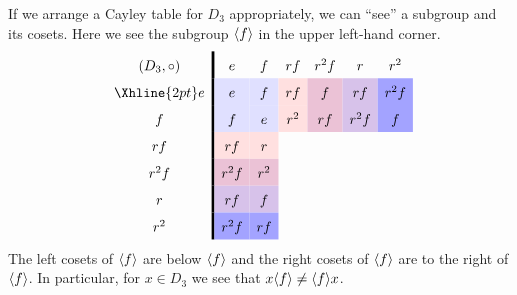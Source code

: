 \documentclass{ximera}
\begin{document}
\begin{example}
  If we arrange a Cayley table for $D_3$ appropriately, we can ``see''
  a subgroup and its cosets. Here we see the subgroup $\langle f\rangle$ in the
  upper left-hand corner.
    \[
    \renewcommand{\arraystretch}{1.6}
    \begin{array}{c!{\vline width 2pt}cccccc}
      (D_3,\circ)& e                         & f                              & rf                            & r^2f                             & r                                    & r^2  \\  \Xhline{2pt}
      e          & e\cellcolor{blue!12!white}     & f\cellcolor{blue!12!white}    & rf\cellcolor{red!12!white}   & f \cellcolor{blue!33!red!24!white}     & r f \cellcolor{blue!66!red!24!white}   & r^2f \cellcolor{blue!36!white} \\  
      f                & f\cellcolor{blue!12!white}    & e\cellcolor{blue!12!white}   & r^2 \cellcolor{red!12!white}    & rf\cellcolor{blue!33!red!24!white} & r^2f \cellcolor{blue!66!red!24!white}    & f \cellcolor{blue!36!white}   \\  
      rf                & rf\cellcolor{red!12!white}   & r\cellcolor{red!12!white}     &    &    &  &     \\  
      r^2f       & r^2f \cellcolor{blue!33!red!24!white}   & r^2 \cellcolor{blue!33!red!24!white}   &   &      &   &   \\  
      r      & rf \cellcolor{blue!66!red!24!white}   & f \cellcolor{blue!66!red!24!white} &    &   &      &     \\  
      r^2       & r^2 f\cellcolor{blue!36!white} & rf \cellcolor{blue!36!white}    &   &    &     &      \\  
    \end{array}
    \]
    The left cosets of $\langle f\rangle$ are below $\langle f\rangle$ and the right cosets
    of $\langle f\rangle$ are to the right of $\langle f\rangle$. In particular, for $x\in
    D_3$ we see that $x\langle f\rangle \ne \langle f\rangle x$.
\end{example}
\end{document}

